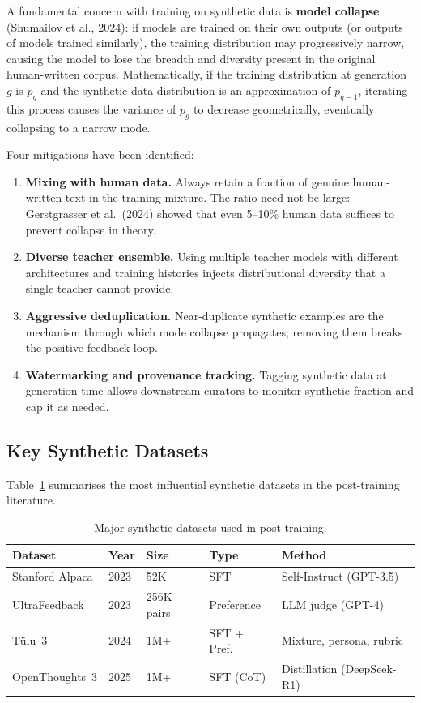 A fundamental concern with training on synthetic data is \textbf{model collapse} (Shumailov et al., 2024): if models are trained on their own outputs (or outputs of models trained similarly), the training distribution may progressively narrow, causing the model to lose the breadth and diversity present in the original human-written corpus. Mathematically, if the training distribution at generation $g$ is $p_g$ and the synthetic data distribution is an approximation of $p_{g-1}$, iterating this process causes the variance of $p_g$ to decrease geometrically, eventually collapsing to a narrow mode.

Four mitigations have been identified:

\begin{enumerate}[leftmargin=*]
  \item \textbf{Mixing with human data.} Always retain a fraction of genuine human-written text in the training mixture. The ratio need not be large: Gerstgrasser et al.\ (2024) showed that even 5--10\% human data suffices to prevent collapse in theory.
  \item \textbf{Diverse teacher ensemble.} Using multiple teacher models with different architectures and training histories injects distributional diversity that a single teacher cannot provide.
  \item \textbf{Aggressive deduplication.} Near-duplicate synthetic examples are the mechanism through which mode collapse propagates; removing them breaks the positive feedback loop.
  \item \textbf{Watermarking and provenance tracking.} Tagging synthetic data at generation time allows downstream curators to monitor synthetic fraction and cap it as needed.
\end{enumerate}

\subsection{Key Synthetic Datasets}

Table~\ref{tab:synthetic-datasets} summarises the most influential synthetic datasets in the post-training literature.

\begin{table}[ht]
\centering
\caption{Major synthetic datasets used in post-training.}
\label{tab:synthetic-datasets}
\begin{tabular}{lllll}
\toprule
\textbf{Dataset} & \textbf{Year} & \textbf{Size} & \textbf{Type} & \textbf{Method} \\
\midrule
Stanford Alpaca     & 2023 & 52K    & SFT          & Self-Instruct (GPT-3.5) \\
UltraFeedback       & 2023 & 256K pairs & Preference  & LLM judge (GPT-4) \\
T\"{u}lu~3          & 2024 & 1M+    & SFT + Pref.  & Mixture, persona, rubric \\
OpenThoughts~3      & 2025 & 1M+    & SFT (CoT)    & Distillation (DeepSeek-R1) \\
\bottomrule
\end{tabular}
\end{table}

